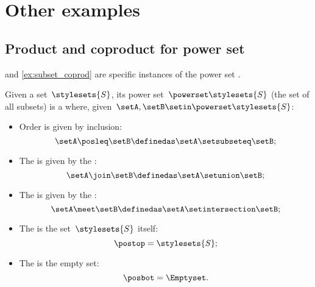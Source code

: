 
\section{Other examples}

\subsection{Product and coproduct for power set}
 and \cref{ex:subset_coprod} are specific instances of the power set .

\begin{ctdefinition}
    \label{def:power-set-as-lattice}
    Given a set~$\stylesets{S}$, its power set~$\powerset \stylesets{S}$ (the set of all subsets) is a  where, given~$\setA,\setB\setin \powerset \stylesets{S}$:
    \begin{itemize}
        \item Order is given by inclusion:
              \begin{equation}
                  \setA\posleq \setB \definedas \setA\setsubseteq \setB;
              \end{equation}
        \item The  is given by the :
              \begin{equation}
                  \setA\join \setB \definedas \setA\setunion \setB;
              \end{equation}
        \item The  is given by the :
              \begin{equation}
                  \setA\meet \setB \definedas \setA\setintersection \setB;
              \end{equation}
        \item The  is the set~$\stylesets{S}$ itself:
              \begin{equation}
                  \postop = \stylesets{S};
              \end{equation}
        \item The  is the empty set:
              \begin{equation}
                  \posbot = \Emptyset.
              \end{equation}
    \end{itemize}
\end{ctdefinition}

